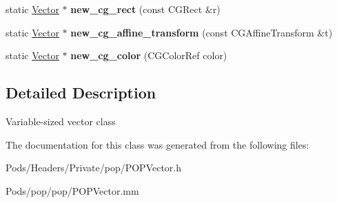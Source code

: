 \begin{DoxyCompactItemize}
\item 
\mbox{\label{class_p_o_p_1_1_vector_a502c3dbfd02050530f1f35db9cbbd339}} 
static \mbox{\hyperlink{class_p_o_p_1_1_vector}{Vector}} $\ast$ {\bfseries new\+\_\+cg\+\_\+rect} (const C\+G\+Rect \&r)
\item 
\mbox{\label{class_p_o_p_1_1_vector_a252d5d875d40836e4cd46d2e55498307}} 
static \mbox{\hyperlink{class_p_o_p_1_1_vector}{Vector}} $\ast$ {\bfseries new\+\_\+cg\+\_\+affine\+\_\+transform} (const C\+G\+Affine\+Transform \&t)
\item 
\mbox{\label{class_p_o_p_1_1_vector_afe3c7f857072ce76516f4d5ac5778489}} 
static \mbox{\hyperlink{class_p_o_p_1_1_vector}{Vector}} $\ast$ {\bfseries new\+\_\+cg\+\_\+color} (C\+G\+Color\+Ref color)
\end{DoxyCompactItemize}


\subsection{Detailed Description}
Variable-\/sized vector class 

The documentation for this class was generated from the following files\+:\begin{DoxyCompactItemize}
\item 
Pods/\+Headers/\+Private/pop/P\+O\+P\+Vector.\+h\item 
Pods/pop/pop/P\+O\+P\+Vector.\+mm\end{DoxyCompactItemize}
